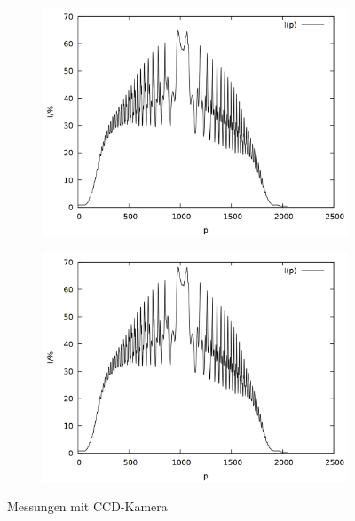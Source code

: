 \begin{figure}[!h]
\begin{subfigure}{0.45\textwidth}
\includegraphics[width=\textwidth]{data/zeeman/out_7_2_raw.png}
\end{subfigure}
\begin{subfigure}{0.45\textwidth}
\includegraphics[width=\textwidth]{data/zeeman/out_7_5_raw.png}
\end{subfigure}
\caption{Messungen mit CCD-Kamera}
\label{fig:raw_1}
\end{figure}
\newpage
